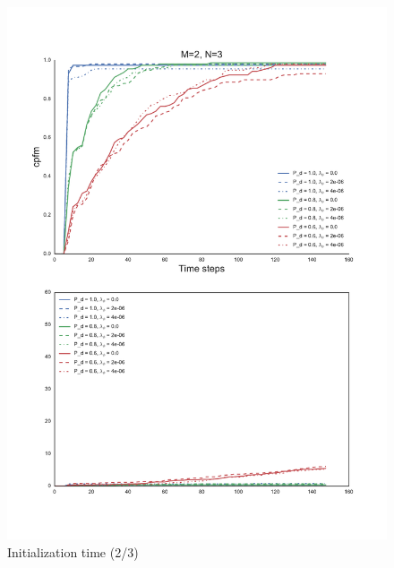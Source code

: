 \begin{figure}
\centering
\includegraphics[height = .9\textheight]{Figures/plots/Scenario1_Init-Time(2-3).pdf}
\caption{Initialization time (2/3)}\label{fig:init_time_2-3}
\end{figure}

